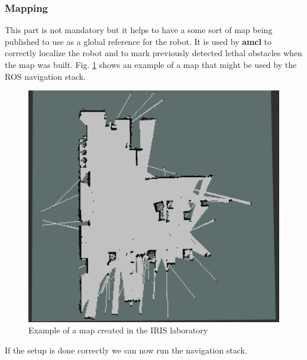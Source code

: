 \documentclass[12pt]{article}
\begin{document}
\subsubsection{Mapping}
This part is not mandatory but it helps to have a some sort of map being published to use as a global reference for the robot. It is used by \textbf{amcl} to correctly localize the robot and to mark previously detected lethal obstacles when the map was built. Fig. \ref{fig:map} shows an example of a map that might be used by the ROS navigation stack.
\begin{figure}[!htb]
    \centering
    \includegraphics[scale=0.2]{map.png}
    \caption{Example of a map created in the IRIS laboratory}
    \label{fig:map}
\end{figure}


If the setup is done correctly we can now run the navigation stack.
\end{document}
